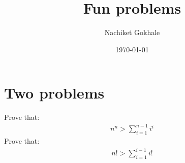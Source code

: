 \documentclass{article}
\newcommand{\ber}{\begin{eqnarray}}
\newcommand{\eer}{\end{eqnarray}}
\begin{document}
\title{Fun problems}
\author{Nachiket Gokhale}
\date{\today}
\maketitle
\section{Two problems}
Prove that:
\ber
n^n > \sum_{i=1}^{n-1}i^i
\eer
Prove that:
\ber
n! > \sum_{i=1}^{i-1}i!
\eer
\end{document}
